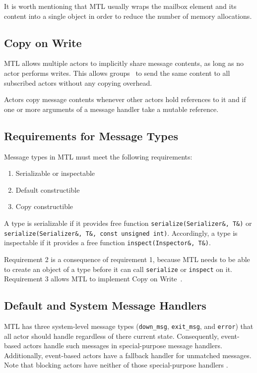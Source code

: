 It is worth mentioning that MTL usually wraps the mailbox element and its
content into a single object in order to reduce the number of memory
allocations.

\subsection{Copy on Write}
\label{copy-on-write}

MTL allows multiple actors to implicitly share message contents, as long as no
actor performs writes. This allows groups~ to send the same content
to all subscribed actors without any copying overhead.

Actors copy message contents whenever other actors hold references to it and if
one or more arguments of a message handler take a mutable reference.

\subsection{Requirements for Message Types}

Message types in MTL must meet the following requirements:

\begin{enumerate}
\item Serializable or inspectable 
\item Default constructible
\item Copy constructible
\end{enumerate}

A type is serializable if it provides free function \lstinline^serialize(Serializer&, T&)^ or \lstinline^serialize(Serializer&, T&, const unsigned int)^. Accordingly, a type is inspectable if it provides a free function \lstinline^inspect(Inspector&, T&)^.

Requirement 2 is a consequence of requirement 1, because MTL needs to be able
to create an object of a type before it can call \lstinline^serialize^ or
\lstinline^inspect^ on it. Requirement 3 allows MTL to implement Copy on
Write~.

\subsection{Default and System Message Handlers}
\label{special-handler}

MTL has three system-level message types (\lstinline^down_msg^,
\lstinline^exit_msg^, and \lstinline^error^) that all actor should handle
regardless of there current state. Consequently, event-based actors handle such
messages in special-purpose message handlers. Additionally, event-based actors
have a fallback handler for unmatched messages. Note that blocking actors have
neither of those special-purpose handlers .

